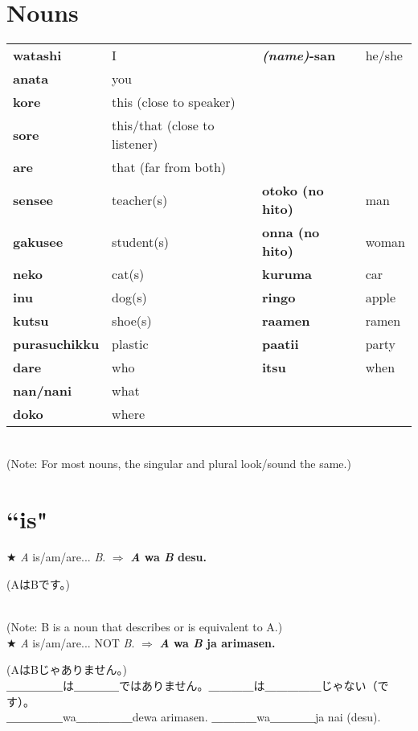 \documentclass[11pt]{article} %
\newcommand{\ee}{\vspace{.10cm}\\} %
\begin{document}
\section{Nouns}
\begin{tabular}{l | l || l | l}
\textbf{watashi} & I						& \textbf{\textit{(name)}-san} & he/she\\
\textbf{anata} & you\\
\hline
\textbf{kore} & this (close to speaker)\\
\textbf{sore} & this/that (close to listener)\\
\textbf{are} & that (far from both)\\
\hline
\textbf{sensee} & teacher(s)				& \textbf{otoko (no hito)} & man\\
\textbf{gakusee} & student(s)				& \textbf{onna (no hito)}  & woman\\
\textbf{neko} & cat(s)						& \textbf{kuruma}		   & car\\
\textbf{inu} & dog(s)						& \textbf{ringo}		   & apple\\
\textbf{kutsu} & shoe(s)					& \textbf{raamen}		   & ramen\\
\textbf{purasuchikku} & plastic				& \textbf{paatii}		   & party\\
\hline
\textbf{dare} & who							& \textbf{itsu}				& when\\
\textbf{nan/nani} & what\\
\textbf{doko} & where\\
\end{tabular}\\
(Note: For most nouns, the singular and plural look/sound the same.)


\section{``is"}
$\bigstar$ \textit{A} is/am/are... \textit{B}. $\Rightarrow$ \textbf{\textit{A} wa \textit{B} desu.}
\begin{CJK}{UTF8}{min}(AはBです。)\end{CJK}\\
(Note: B is a noun that describes or is equivalent to A.)\ee

$\bigstar$ \textit{A} is/am/are... NOT \textit{B}. $\Rightarrow$ \textbf{\textit{A} wa \textit{B} ja arimasen.}
\begin{CJK}{UTF8}{min}(AはBじゃありません。)\\
＿＿＿＿＿は＿＿＿＿ではありません。＿＿＿＿は＿＿＿＿＿じゃない（です）。\\
＿＿＿＿＿wa＿＿＿＿＿dewa arimasen. ＿＿＿＿wa＿＿＿＿ja nai (desu).\end{CJK}\ee
\end{document}
